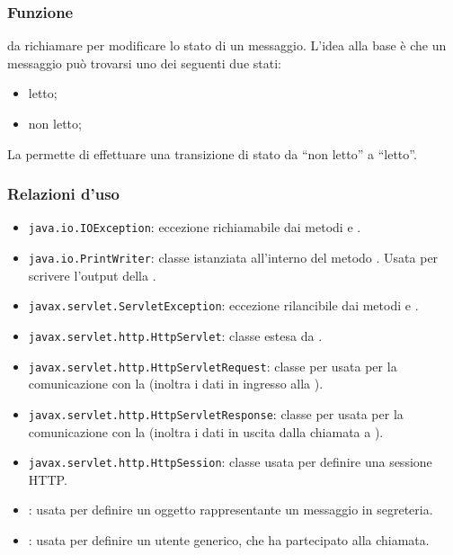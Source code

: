 
\subsubsection*{Funzione}
 da richiamare per modificare lo stato di un messaggio. L'idea alla base è che un messaggio può trovarsi uno dei seguenti due stati:
\begin{itemize}
	\item letto;
	\item non letto;
\end{itemize}
La  permette di effettuare una transizione di stato da ``non letto'' a ``letto''.

\subsubsection*{Relazioni d'uso}
\begin{itemize}
	\item \texttt{java.io.IOException}: eccezione richiamabile dai metodi  e .
	\item \texttt{java.io.PrintWriter}: classe istanziata all'interno del metodo . Usata per scrivere l'output della .
	\item \texttt{javax.servlet.ServletException}: eccezione rilancibile dai metodi  e .
	\item \texttt{javax.servlet.http.HttpServlet}: classe estesa da .
	\item \texttt{javax.servlet.http.HttpServletRequest}:  classe per usata per la comunicazione con la  (inoltra i dati in ingresso alla ).
	\item \texttt{javax.servlet.http.HttpServletResponse}: classe per usata per la comunicazione con la  (inoltra i dati in uscita dalla chiamata a ).
	\item \texttt{javax.servlet.http.HttpSession}: classe usata per definire una sessione HTTP.
	\item {}: usata per definire un oggetto rappresentante un messaggio in segreteria.
	\item {}: usata per definire un utente generico, che ha partecipato alla chiamata.
\end{itemize}

